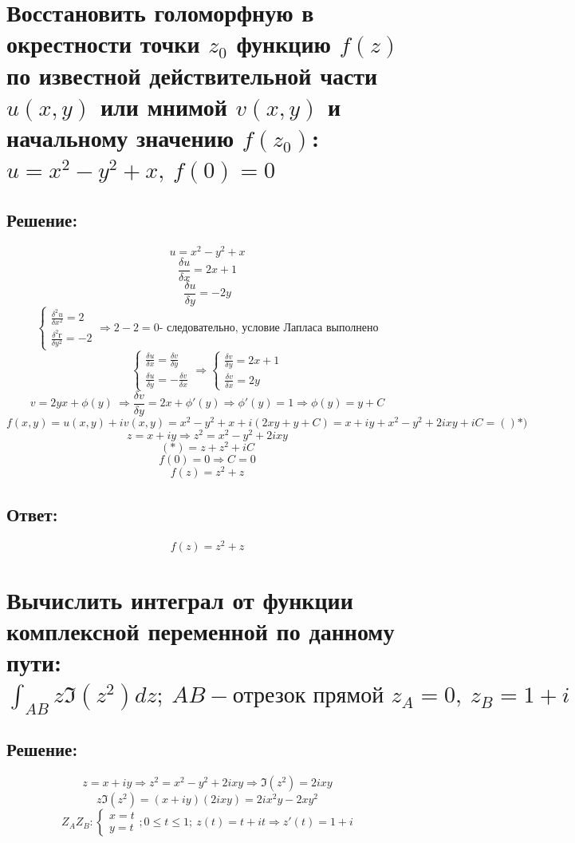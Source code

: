 \documentclass{article}
\begin{document}
	
	
	\section{Восстановить голоморфную в окрестности точки $z_0$ функцию $f(z)$ по известной действительной части $u(x,y)$ или мнимой $v(x,y)$ и начальному значению $f(z_0)$: $u = x^2 - y^2 + x, \ f(0) = 0$}
	\subsection{Решение:}
	\[u = x^2 - y^2 + x\]
	\[\frac{\delta u}{\delta x} = 2x+1\]
	\[\frac{\delta u}{\delta y} = -2y\]
	\[\begin{cases}
		\frac{\delta^2 u}{\delta x ^2} = 2\\
		\frac{\delta ^ 2 г}{\delta y^2} = -2
	\end{cases} \Rightarrow 2 -2 = 0 \text{- следовательно, условие Лапласа выполнено}\]
	 \[\begin{cases}
	 	\frac{\delta u }{\delta x} = \frac{\delta v}{\delta y} \\
	 	\frac{\delta u} {\delta y} = - \frac{\delta v}{\delta x}
	 \end{cases} \Rightarrow
	 \begin{cases}
	 	\frac{\delta v}{\delta y} = 2x+1 \\
	 	\frac{\delta v}{\delta x} = 2y
	 \end{cases}\]
	 \[v = 2yx + \phi (y) \ \Rightarrow \frac{\delta v}{\delta y} =2x + \phi'(y) \Rightarrow \phi' (y) = 1 \Rightarrow \phi(y) = y+C\]
	 \[f(x,y) = u(x,y) + iv(x,y) = x^2 - y^2 +x + i (2xy + y + C)  = x + iy + x^2 - y^2 + 2ixy + iC =()*)\]
	 \[z = x + iy \Rightarrow z ^2 = x^2 - y^2 +2ixy\]
	 \[(*) = z + z^2 + iC\]
	 \[f(0) = 0 \Rightarrow C = 0\]
	 \[f(z) = z^2 + z\]
	\subsection{Ответ:}
	\[f(z) = z^2 + z\]
	
	\section{Вычислить интеграл от функции комплексной переменной по данному пути: $\int_{AB} z \Im(z^2) dz; \ AB - \text{отрезок прямой } z_A = 0, \ z_B = 1 + i$}
	\subsection{Решение:}
	\[z= x +iy \Rightarrow z ^2 = x^2 - y^2 + 2ixy \Rightarrow \Im(z^2) = 2ixy\]
	\[z\Im (z^2) = (x+iy)(2ixy) = 2ix^2y - 2xy^2\]
	\[Z_AZ_B: \begin{cases}
		x =t \\ y = t
	\end{cases}; 0 \le t \le 1; \ z(t) = t + it \Rightarrow z'(t) = 1 + i\]
	
\end{document}
